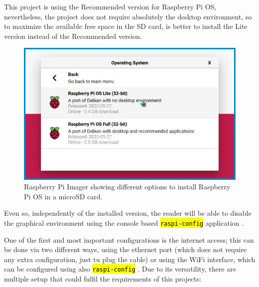 \documentclass[11pt,a4paper,dvipsnames,twoside]{article}
\newcommand{\cmd}[1] {\hl{\texttt{#1}}}
\begin{document}
This project is using the Recommended version for Raspberry Pi OS, nevertheless, the project does not require absolutely the desktop environment, so to maximize the available free space in the SD card, is better to install the Lite version instead of the Recommended version.

\begin{figure}[htp]
  \centering
  \includegraphics[width=.9\textwidth]{../pictures/rpi_imager.png}
  \caption{Raspberry Pi Imager showing different options to install Raspberry Pi OS in a microSD card.}
  \label{fig:RpiImager}
\end{figure}

Even so, independently of the installed version, the reader will be able to disable the graphical environment using the console based \cmd{raspi-config} application \cite{RaspiConf}. 

One of the first and most important configurations is the internet access; this can be done via two different ways, using the ethernet port (which does not require any extra configuration, just tu plug the cable) or using the WiFi interface, which can be configured using also \cmd{raspi-config} \cite{RaspiWIFIcli}. Due to its versatility, there are multiple setup that could fulfil the requirements of this projects:
\end{document}
